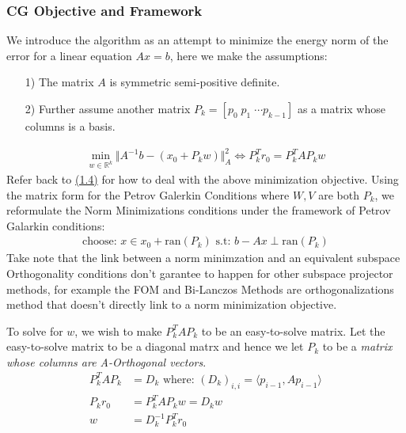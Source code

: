 \documentclass[]{article}
\theoremstyle{definition}
\begin{document}
        \subsubsection{CG Objective and Framework}
            We introduce the algorithm as an attempt to minimize the energy norm of the error for a linear equation $Ax = b$, here we make the assumptions: 
            \begin{itemize}
                \item [1)] The matrix $A$ is symmetric semi-positive definite.  
                \item [2)] Further assume another matrix $P_k = [p_0 \;p_1\;\cdots p_{k-1}]$ as a matrix whose columns is a basis.
            \end{itemize}
            \begin{align}
                \min_{w \in \mathbb{R}^k}\Vert 
                    A^{-1}b - (x_0 + P_kw)
                \Vert_A^2 \iff P^T_kr_0 = P_k^TAP_kw
            \end{align}
            Refer back to \hyperref[sec:1.4]{(1.4)} for how to deal with the above minimization objective. Using the matrix form for the Petrov Galerkin Conditions where $W, V$ are both $P_k$, we reformulate the Norm Minimizations conditions under the framework of Petrov Galarkin conditions: 
            \begin{align}
                \text{choose: }x \in x_0 + \text{ran}(P_k) \text{ s.t: } b - Ax \perp \text{ran}(P_k)    
            \end{align}
            Take note that the link between a norm minimzation and an equivalent subspace Orthogonality conditions don't garantee to happen for other subspace projector methods, for example the FOM and Bi-Lanczos Methods are orthogonalizations method that doesn't directly link to a norm minimization objective. 
            \par
            To solve for $w$, we wish to make $P_k^TAP_k$ to be an easy-to-solve matrix. Let the easy-to-solve matrix to be a diagonal matrx and hence we let $P_k$ to be a \textit{matrix whose columns are A-Orthogonal vectors}.
            \begin{align}
                P^T_kAP_k &= D_k \text{ where: } (D_k)_{i,i} = \langle p_{i - 1}, Ap_{i - 1}\rangle
                \\
                P_kr_0 &= P^T_kAP_kw = D_kw
                \\
                w &= D^{-1}_kP_k^Tr_0
            \end{align}
\end{document}
